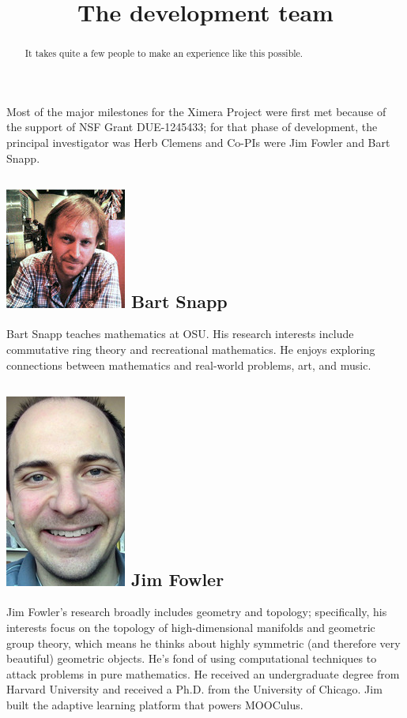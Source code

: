 \documentclass{ximera}
\title{The development team}
\begin{document}
\begin{abstract}
  It takes quite a few people to make an experience like this possible.
\end{abstract}
\maketitle

Most of the major milestones for the Ximera Project were first met
because of the support of NSF Grant DUE-1245433; for that phase of
development, the principal investigator was Herb Clemens and Co-PIs
were Jim Fowler and Bart Snapp.

\subsection*{\includegraphics{people/bart-snapp-150.jpg} Bart Snapp}


Bart Snapp teaches mathematics at OSU.  His research interests include
commutative ring theory and recreational mathematics.  He enjoys
exploring connections between mathematics and real-world problems,
art, and music.


\subsection*{\includegraphics{people/jim-fowler-150.jpg} Jim Fowler}


Jim Fowler's research broadly includes geometry and topology;
specifically, his interests focus on the topology of high-dimensional
manifolds and geometric group theory, which means he thinks about
highly symmetric (and therefore very beautiful) geometric objects.
He's fond of using computational techniques to attack problems in pure
mathematics. He received an undergraduate degree from Harvard
University and received a Ph.D. from the University of Chicago.  Jim
built the adaptive learning platform that powers MOOCulus.
\end{document}
